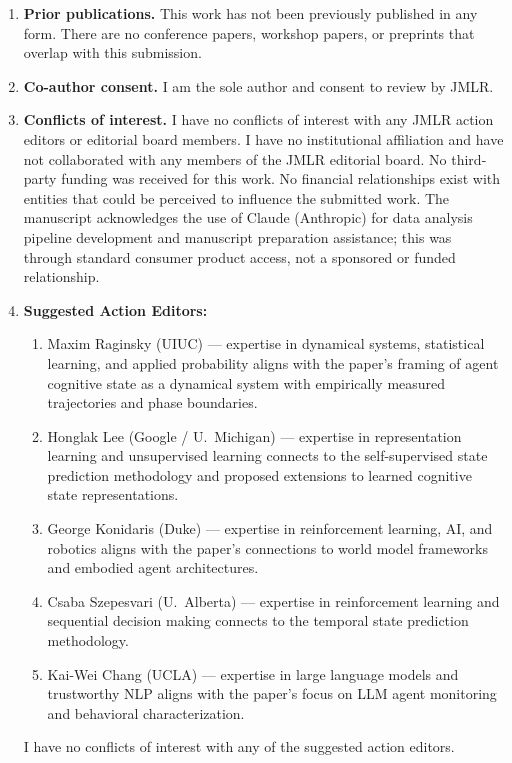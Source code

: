 \begin{enumerate}
\item \textbf{Prior publications.} This work has not been previously published in any form. There are no conference papers, workshop papers, or preprints that overlap with this submission.

\item \textbf{Co-author consent.} I am the sole author and consent to review by JMLR.

\item \textbf{Conflicts of interest.} I have no conflicts of interest with any JMLR action editors or editorial board members. I have no institutional affiliation and have not collaborated with any members of the JMLR editorial board. No third-party funding was received for this work. No financial relationships exist with entities that could be perceived to influence the submitted work. The manuscript acknowledges the use of Claude (Anthropic) for data analysis pipeline development and manuscript preparation assistance; this was through standard consumer product access, not a sponsored or funded relationship.

\item \textbf{Suggested Action Editors:}
\begin{enumerate}
\item Maxim Raginsky (UIUC) --- expertise in dynamical systems, statistical learning, and applied probability aligns with the paper's framing of agent cognitive state as a dynamical system with empirically measured trajectories and phase boundaries.
\item Honglak Lee (Google / U.\ Michigan) --- expertise in representation learning and unsupervised learning connects to the self-supervised state prediction methodology and proposed extensions to learned cognitive state representations.
\item George Konidaris (Duke) --- expertise in reinforcement learning, AI, and robotics aligns with the paper's connections to world model frameworks and embodied agent architectures.
\item Csaba Szepesvari (U.\ Alberta) --- expertise in reinforcement learning and sequential decision making connects to the temporal state prediction methodology.
\item Kai-Wei Chang (UCLA) --- expertise in large language models and trustworthy NLP aligns with the paper's focus on LLM agent monitoring and behavioral characterization.
\end{enumerate}
I have no conflicts of interest with any of the suggested action editors.


\end{enumerate}
